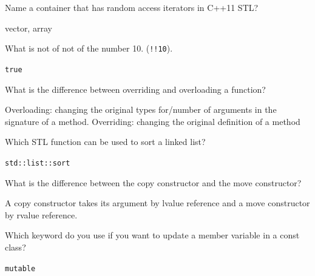 \documentclass[answers]{exam}
\begin{document}
\begin{questions}
\question Name a container that has random access iterators in C++11 STL?
\begin{solution}[.2in]
	vector, array
\end{solution}

\question What is not of not of the number 10. (\lstinline{!!10}).
\begin{solution}[.2in]
	\lstinline{true}
\end{solution}

\question What is the difference between overriding and overloading a function?
\begin{solution}[.2in]
Overloading: changing the original types for/number of arguments in the signature of a method. Overriding: changing the original definition of a method
\end{solution}

\question Which STL function can be used to sort a linked list?
\begin{solution}[.2in]
	\lstinline{std::list::sort}
\end{solution}

\question What is the difference between the copy constructor and the move constructor?
\begin{solution}[.2in]
A copy constructor takes its argument by lvalue reference and a move constructor by rvalue reference.
\end{solution}

\question Which keyword do you use if you want to update a member variable in a const class?
\begin{solution}[.2in]
	\lstinline{mutable}
\end{solution}


\end{questions}
\end{document}

